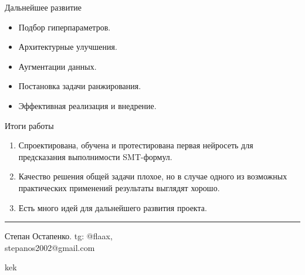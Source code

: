 \documentclass[14pt,aspectratio=169,hyperref={pdftex,unicode},xcolor=dvipsnames]{beamer}
\begin{document}
\begin{frame}{Дальнейшее развитие}

\begin{itemize}
  \item Подбор гиперпараметров.
  \item Архитектурные улучшения.
  \item Аугментации данных.
  \item Постановка задачи ранжирования.
  \item Эффективная реализация и внедрение.
\end{itemize}

\end{frame}



\begin{frame}{Итоги работы}

\begin{enumerate}
  \item Спроектирована, обучена и протестирована первая нейросеть для предсказания выполнимости SMT-формул.
  \item Качество решения общей задачи плохое, но в случае одного из возможных практических применений результаты выглядят хорошо.
  \item Есть много идей для дальнейшего развития проекта.
\end{enumerate}

\vspace{2mm}\hrule

\begin{minipage}{0.5\textwidth}
\begin{center}

Степан Остапенко. tg: @flaax, \\ stepanos2002@gmail.com

\end{center}
\end{minipage}%
\begin{minipage}{0.5\textwidth}
\begin{center}

kek

\end{center}
\end{minipage}

\end{frame}
\end{document}
